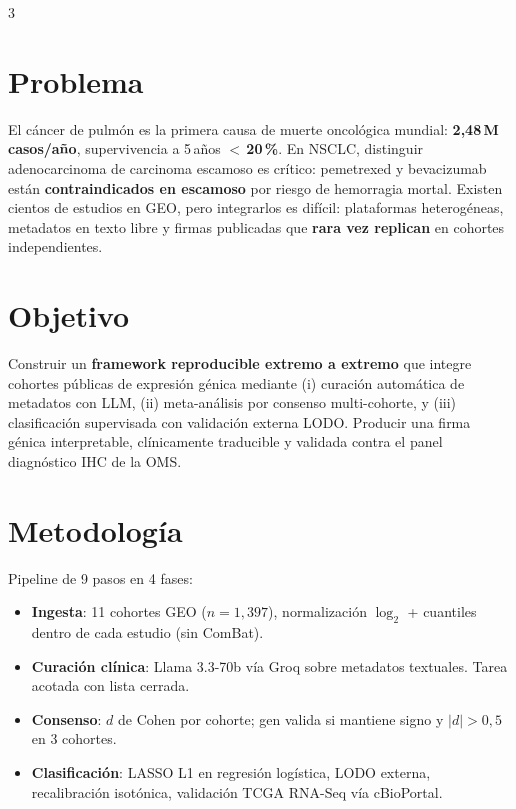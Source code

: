 \documentclass[10pt, a4paper, landscape]{article}
\begin{document}
\vspace{0.4em}

\begin{multicols}{3}

\section{Problema}
\footnotesize
El c\'ancer de pulm\'on es la primera causa de muerte oncol\'ogica
mundial: \textbf{2,48\,M casos/a\~no}, supervivencia a 5\,a\~nos
\textbf{$<$\,20\,\%}. En NSCLC, distinguir adenocarcinoma de carcinoma
escamoso es cr\'itico: pemetrexed y bevacizumab est\'an
\textbf{contraindicados en escamoso} por riesgo de hemorragia mortal.
Existen cientos de estudios en GEO, pero integrarlos es dif\'icil:
plataformas heterog\'eneas, metadatos en texto libre y firmas
publicadas que \textbf{rara vez replican} en cohortes independientes.

\section{Objetivo}
\footnotesize
Construir un \textbf{framework reproducible extremo a extremo} que
integre cohortes p\'ublicas de expresi\'on g\'enica mediante
(i) curaci\'on autom\'atica de metadatos con LLM, (ii) meta-an\'alisis
por consenso multi-cohorte, y (iii) clasificaci\'on supervisada con
validaci\'on externa LODO. Producir una firma g\'enica interpretable,
cl\'inicamente traducible y validada contra el panel diagn\'ostico
IHC de la OMS.

\section{Metodolog\'ia}
\footnotesize
Pipeline de 9 pasos en 4 fases:
\begin{itemize}[leftmargin=1em, itemsep=0pt, topsep=1pt]
  \item \textbf{Ingesta}: 11 cohortes GEO ($n=1{,}397$), normalizaci\'on
  $\log_2$ + cuantiles dentro de cada estudio (sin ComBat).
  \item \textbf{Curaci\'on cl\'inica}: Llama 3.3-70b v\'ia Groq sobre
  metadatos textuales. Tarea acotada con lista cerrada.
  \item \textbf{Consenso}: $d$ de Cohen por cohorte; gen valida si
  mantiene signo y $|d|>0{,}5$ en 3 cohortes.
  \item \textbf{Clasificaci\'on}: LASSO L1 en regresi\'on log\'istica,
  LODO externa, recalibraci\'on isot\'onica, validaci\'on TCGA RNA-Seq
  v\'ia cBioPortal.
\end{itemize}


\end{multicols}
\end{document}
